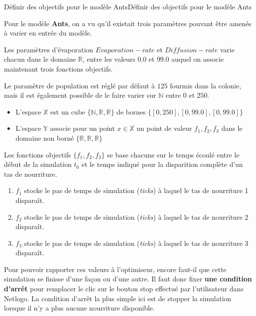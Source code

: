 \begin{testiv}{Définir des objectifs pour le modèle Ants}{Définir des objectifs pour le modèle Ants}

Pour le modèle \textbf{Ants}, on a vu qu'il existait trois paramètres pouvant être amenés à varier en entrée du modèle.

Les paramètres d'évaporation $Evaporation-rate$ et $Diffusion-rate$ varie chacun dans le domaine $\mathbb{R}$, entre les valeurs $0.0$ et $99.0$ auquel on associe maintenant trois fonctions objectifs.

Le paramètre de population est réglé par défaut à $125$ fourmis dans la colonie, mais il est également possible de le faire varier sur $\mathbb{N}$ entre $0$ et $250$.

\begin{itemize}[noitemsep,nolistsep]
\item L'espace $\mathbb{X}$ est un cube $\{\mathbb{N},\mathbb{R},\mathbb{R}\}$ de bornes $\{[0,250], [0,99.0], [0,99.0]\}$
\item L'espace $\mathbb{Y}$ associe pour un point $x \in \mathbb{X}$ un point de valeur ${f_1,f_2,f_3}$ dans le domaine non borné $\{\mathbb{R},\mathbb{R},\mathbb{R}\}$
\end{itemize}

Les fonctions objectifs $\{f_1,f_2,f_3\}$  se base chacune sur le temps écoulé entre le début de la simulation $t_0$ et le temps indiqué pour la disparition complète d'un tas de nourriture.

\begin{enumerate}
\item $f_1$ stocke le pas de temps de simulation (\textit{ticks}) à laquel le tas de nourriture 1 disparaît.
\item $f_2$ stocke le pas de temps de simulation (\textit{ticks}) à laquel le tas de nourriture 2 disparaît.
\item $f_3$ stocke le pas de temps de simulation (\textit{ticks}) à laquel le tas de nourriture 3 disparaît.
\end{enumerate}

Pour pouvoir rapporter ces valeurs à l'optimiseur, encore faut-il que cette simulation se finisse d'une façon ou d'une autre. Il faut donc fixer \textbf{une condition d'arrêt} pour remplacer le clic sur le bouton stop effectué par l'utilisateur dans Netlogo. La condition d'arrêt la plus simple ici est de stopper la simulation lorsque il n'y a plus aucune nourriture disponible.


\end{testiv}
